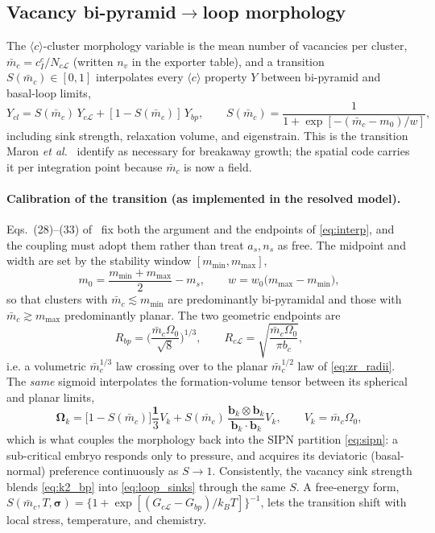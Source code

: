 \documentclass[11pt]{article}
\newcommand{\sig}{\bm{\sigma}}
\newcommand{\Oh}{\Omega}
\newcommand{\kb}{k_{B}}
\newcommand{\Lcal}{\mathcal{L}}
\begin{document}
\subsection{Vacancy bi-pyramid$\to$loop morphology}
\label{sec:morph}

The $\langle c\rangle$-cluster morphology variable is the mean number of
vacancies per cluster, $\bar m_{c}=c^{c}_I/N_{c\Lcal}$ (written $n_v$ in the
exporter table), and a transition $S(\bar m_c)\in[0,1]$ interpolates every
$\langle c\rangle$ property $Y$ between bi-pyramid and basal-loop limits,
\begin{equation}
\label{eq:interp}
    Y_{cl}=S(\bar m_c)\,Y_{c\Lcal}+[1-S(\bar m_c)]\,Y_{bp},
    \qquad
    S(\bar m_c)=\frac{1}{1+\exp[-(\bar m_c-m_0)/w]},
\end{equation}
including sink strength, relaxation volume, and eigenstrain. This is the
transition Maron \emph{et al.}~\cite{Maron2024} identify as necessary for
breakaway growth; the spatial code carries it per integration point because
$\bar m_c$ is now a field.

\paragraph{Calibration of the transition (as implemented in the resolved model).}
Eqs.~(28)--(33) of~\cite{PoGhoniem2026D1M1} fix both the argument and the
endpoints of \eqref{eq:interp}, and the coupling must adopt them rather than
treat $a_s,n_s$ as free. The midpoint and width are set by the stability window
$[m_{\min},m_{\max}]$,
\begin{equation}
\label{eq:sigmoid_cal}
    m_0=\frac{m_{\min}+m_{\max}}{2}-m_s,
    \qquad
    w=w_0\big(m_{\max}-m_{\min}\big),
\end{equation}
so that clusters with $\bar m_c\lesssim m_{\min}$ are predominantly
bi-pyramidal and those with $\bar m_c\gtrsim m_{\max}$ predominantly planar. The
two geometric endpoints are
\begin{equation}
\label{eq:radii_limits}
    R_{bp}=\Big(\frac{\bar m_c\Oh_0}{\sqrt8}\Big)^{1/3},
    \qquad
    R_{c\Lcal}=\sqrt{\frac{\bar m_c\Oh_0}{\pi b_c}},
\end{equation}
i.e. a volumetric $\bar m_c^{1/3}$ law crossing over to the planar
$\bar m_c^{1/2}$ law of \eqref{eq:zr_radii}. The \emph{same} sigmoid
interpolates the formation-volume tensor between its spherical and planar limits,
\begin{equation}
\label{eq:omega_interp}
    \bm\Omega_k=\big[1-S(\bar m_c)\big]\frac{\mathbf 1}{3}V_k
    + S(\bar m_c)\,\frac{\mathbf b_k\otimes\mathbf b_k}{\mathbf b_k\!\cdot\!\mathbf b_k}V_k,
    \qquad V_k=\bar m_c\Oh_0,
\end{equation}
which is what couples the morphology back into the SIPN partition
\eqref{eq:sipn}: a sub-critical embryo responds only to pressure, and acquires
its deviatoric (basal-normal) preference continuously as $S\to1$. Consistently,
the vacancy sink strength blends \eqref{eq:k2_bp} into \eqref{eq:loop_sinks}
through the same $S$. A free-energy form,
$S(\bar m_c,T,\sig)=\{1+\exp[(G_{c\Lcal}-G_{bp})/\kb T]\}^{-1}$, lets the
transition shift with local stress, temperature, and chemistry.
\end{document}
